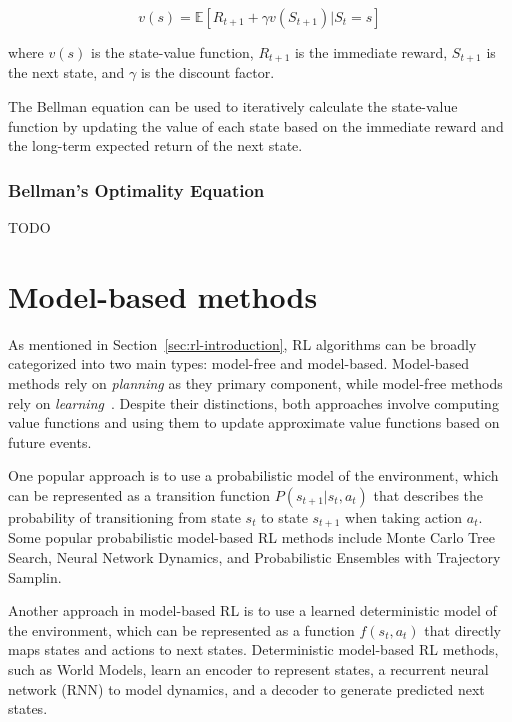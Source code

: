 \documentclass[../xlapes02]{subfiles}
\begin{document}
    \begin{equation}
        v(s) = \mathbb{E}[R_{t+1} + \gamma v(S_{t+1}) | S_t = s]
    \end{equation}

    where $v(s)$ is the state-value function, $R_{t+1}$ is the immediate reward, $S_{t+1}$ is the next state, and $\gamma$ is the discount factor.

    The Bellman equation can be used to iteratively calculate the state-value function by updating the value of each state based on the immediate reward and the long-term expected return of the next state\cite{rao2022foundations}.

    \subsubsection{Bellman's Optimality Equation}\label{subsubsec:bellman-optimality-equation}
    TODO


    \section{Model-based methods}\label{sec:model-based-methods}
    As mentioned in Section~\cref{sec:rl-introduction}, RL algorithms can be broadly categorized into two main types: model-free and model-based. Model-based methods rely on \emph{planning} as they primary component, while model-free methods rely on \emph{learning}~\cite{sutton2018reinforcement}. Despite their distinctions, both approaches involve computing value functions and using them to update approximate value functions based on future events.

    One popular approach is to use a probabilistic model of the environment, which can be represented as a transition function $P(s_{t+1}|s_t, a_t)$ that describes the probability of transitioning from state $s_t$ to state $s_{t+1}$ when taking action $a_t$. Some popular probabilistic model-based RL methods include Monte Carlo Tree Search, Neural Network Dynamics, and Probabilistic Ensembles with Trajectory Samplin.

    Another approach in model-based RL is to use a learned deterministic model of the environment, which can be represented as a function $f(s_t, a_t)$ that directly maps states and actions to next states. Deterministic model-based RL methods, such as World Models, learn an encoder to represent states, a recurrent neural network (RNN) to model dynamics, and a decoder to generate predicted next states.
\end{document}
